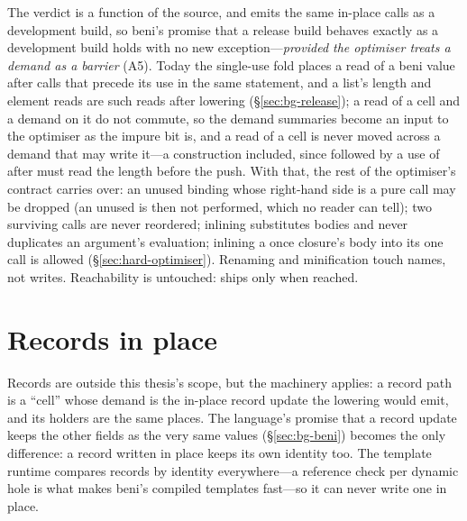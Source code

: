The verdict is a function of the source, and  emits the same in-place calls as a
development build, so beni's promise that a release build behaves exactly as a development build holds
with no new exception---\emph{provided the optimiser treats a demand as a barrier} (A5). Today the
single-use fold places a read of a beni value after calls that precede its use in the same statement,
and a list's length and element reads are such reads after lowering (\S\ref{sec:bg-release}); a read
of a cell and a demand on it do not commute, so the demand summaries become an input to the optimiser as
the impure bit is, and a read of a cell is never moved across a demand that may write it---a construction
included, since  followed by a use of  after \code{[ …xs, 1 ]} must read
the length before the push. With that,
the rest of the optimiser's contract carries over: an unused binding whose right-hand side is a pure
call may be dropped (an unused  is then not performed, which no reader can tell); two
surviving calls are never reordered; inlining substitutes bodies and never duplicates an argument's
evaluation; inlining a once closure's body into its one call is allowed (\S\ref{sec:hard-optimiser}).
Renaming and minification touch names, not writes. Reachability is untouched:  ships only
when reached.

\section{Records in place}
\label{sec:compiler-records}

Records are outside this thesis's scope, but the machinery applies: a record path is a ``cell'' whose
demand is the in-place record update the lowering would emit, and its holders are the same places.
The language's promise that a record update keeps the other fields as the very same values
(\S\ref{sec:bg-beni}) becomes the only difference: a record written in place keeps its own identity
too. The template runtime compares records by identity everywhere---a reference check per dynamic hole is
what makes beni's compiled templates fast---so it can never write one in place.

